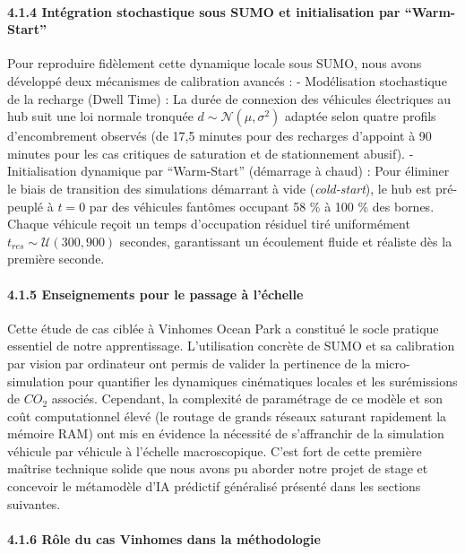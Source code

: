 \documentclass[10pt, a4paper]{article}
\begin{document}
\paragraph{4.1.4 Intégration stochastique sous SUMO et initialisation
par
``Warm-Start''}\label{intuxe9gration-stochastique-sous-sumo-et-initialisation-par-warm-start}

Pour reproduire fidèlement cette dynamique locale sous SUMO, nous avons
développé deux mécanismes de calibration avancés : - Modélisation
stochastique de la recharge (Dwell Time) : La durée de connexion des
véhicules électriques au hub suit une loi normale tronquée
\(d \sim \mathcal{N}(\mu, \sigma^2)\) adaptée selon quatre profils
d'encombrement observés (de 17,5 minutes pour des recharges d'appoint à
90 minutes pour les cas critiques de saturation et de stationnement
abusif). - Initialisation dynamique par ``Warm-Start'' (démarrage à
chaud) : Pour éliminer le biais de transition des simulations démarrant
à vide (\emph{cold-start}), le hub est pré-peuplé à \(t=0\) par des
véhicules fantômes occupant 58 \% à 100 \% des bornes. Chaque véhicule
reçoit un temps d'occupation résiduel tiré uniformément
\(t_{res} \sim \mathcal{U}(300, 900)\) secondes, garantissant un
écoulement fluide et réaliste dès la première seconde.

\paragraph{4.1.5 Enseignements pour le passage à
l'échelle}\label{enseignements-pour-le-passage-uxe0-luxe9chelle}

Cette étude de cas ciblée à Vinhomes Ocean Park a constitué le socle
pratique essentiel de notre apprentissage. L'utilisation concrète de
SUMO et sa calibration par vision par ordinateur ont permis de valider
la pertinence de la micro-simulation pour quantifier les dynamiques
cinématiques locales et les surémissions de \(CO_2\) associés.
Cependant, la complexité de paramétrage de ce modèle et son coût
computationnel élevé (le routage de grands réseaux saturant rapidement
la mémoire RAM) ont mis en évidence la nécessité de s'affranchir de la
simulation véhicule par véhicule à l'échelle macroscopique. C'est fort
de cette première maîtrise technique solide que nous avons pu aborder
notre projet de stage et concevoir le métamodèle d'IA prédictif
généralisé présenté dans les sections suivantes.

\paragraph{4.1.6 Rôle du cas Vinhomes dans la
méthodologie}\label{ruxf4le-du-cas-vinhomes-dans-la-muxe9thodologie}
\end{document}
